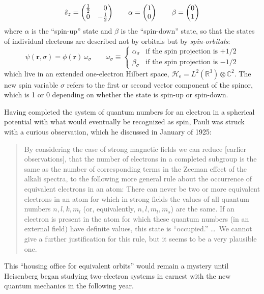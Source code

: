 \begin{equation}
    \hat{s}_z
    =
    \begin{pmatrix}
        \tfrac{1}{2} & \hphantom{+}0 \\
        0 & -\tfrac{1}{2}
    \end{pmatrix}
    \qquad
    \alpha
    =
    \begin{pmatrix}
        1 \\ 0
    \end{pmatrix}
    \qquad
    \beta
    =
    \begin{pmatrix}
        0 \\ 1
    \end{pmatrix}
\end{equation}
where \(\alpha\) is the ``spin-up'' state and \(\beta\) is the ``spin-down''
state, so that the states of individual electrons are described not by orbitals
but by {\itshape spin-orbitals}:
\begin{equation}
    \psi(\mathbf{r}, \sigma)
    =
    \phi(\mathbf{r})\,
    \omega_\sigma
    \qquad
    \omega_\sigma
    \equiv
    \left\{
        \begin{array}{cl}
            \alpha_{\sigma}
            &
            \text{if the spin projection is \(+1/2\)}
            \\[10pt]
            \beta_{\sigma}
            &
            \text{if the spin projection is \(-1/2\)}
        \end{array}
    \right.
\end{equation}
which live in an extended one-electron Hilbert space,
\(
    \mathcal{H}_\mathrm{e}
    =
    L^2(\mathbb{R}^3)
    \otimes
    \mathbb{C}^2
\).
The new spin variable \(\sigma\) refers to the first or second vector component
of the spinor, which is 1 or 0 depending on whether the state is spin-up or
spin-down.

Having completed the system of quantum numbers for an electron in a spherical
potential with what would eventually be recognized as spin, Pauli was struck
with a curious observation, which he discussed in January of 1925:
\begin{quote}
    By considering the case of strong magnetic fields we can reduce [earlier
    observations], that the number of electrons in a completed subgroup is the
    same as the number of corresponding terms in the Zeeman effect of the alkali
    spectra, to the following more general rule about the occurrence of
    equivalent electrons in an atom:
    There can never be two or more equivalent electrons in an atom for which
    in strong fields the values of all quantum numbers \(n, l, k, m_l\) (or,
    equivalently, \(n, l, m_l, m_s\)) are the same.
    If an electron is present in the atom for which these quantum numbers
    (in an external field) have definite values, this state is ``occupied.''
    \dots\
    We cannot give a further justification for this rule, but it seems to be a
    very plausible one.\cite{Pauli:1925p756}
\end{quote}
This ``housing office for equivalent orbits''\cite{Mehra:1982} would remain a
mystery until Heisenberg began studying two-electron systems in earnest with the
new quantum mechanics in the following year.



